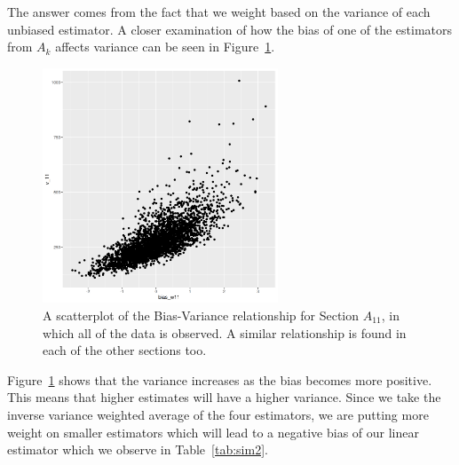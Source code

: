 \documentclass[12pt]{article}
\begin{document}
The answer comes from the fact that we weight based on the variance of 
each unbiased estimator. A closer examination of how the bias of 
one of the estimators from $A_k$ affects variance can be seen in
Figure~\ref{fig:biasvar}.

\begin{figure}[ht!]
  \caption{A scatterplot of the Bias-Variance relationship for Section $A_{11}$,
  in which all of the data is observed. A similar relationship is found in each 
  of the other sections too.}
  \label{fig:biasvar}
  \centering
  \includegraphics[width=7cm]{Images/biasvar_11.png}
\end{figure}

Figure~\ref{fig:biasvar} shows that the variance increases as the bias 
becomes more positive. This means that higher estimates will have 
a higher variance. Since we take the inverse variance weighted average 
of the four estimators, we are putting more weight on smaller estimators 
which will lead to a negative bias of our linear estimator which we 
observe in Table~\ref{tab:sim2}.
\end{document}
